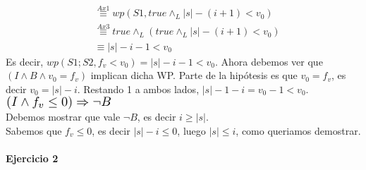 \documentclass{article}
\begin{document}
\begin{enumerate}[label=\alph*)]
\begin{align*}
			&\stackrel{Ax1}{\equiv}wp(S1,true\wedge_L |s|-(i+1)<v_0)\\
			&\stackrel{Ax3}{\equiv}true\wedge_L(true\wedge_L  |s|-(i+1)<v_0)\\
			&\equiv |s|-i-1<v_0
	\end{align*}
	Es decir, $wp(S1;S2,f_v<v_0)=|s|-i-1<v_0$. Ahora debemos ver que $(I\wedge B\wedge v_0=f_v)$ implican dicha WP. Parte de la 
	hipótesis es que $v_0=f_v$, es decir $v_0=|s|-i$. Restando 1 a ambos lados, $|s|-1-i=v_0-1<v_0$.\medskip \\
	$\scalebox{1.3}{$(I\wedge f_v\leq 0)\Rightarrow \neg B$}$\medskip\\
	Debemos mostrar que vale $\neg B$, es decir $i\geq |s|$.\\
	Sabemos que $f_v\leq 0$, es decir $|s|-i\leq 0$, luego $|s|\leq i$, como queriamos demostrar.
\end{enumerate}





\paragraph{Ejercicio 2}
\end{document}
